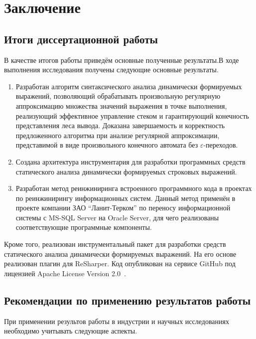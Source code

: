 \chapter*{Заключение}                       %

\section*{Итоги диссертационной работы}

В качестве итогов работы приведём основные полученные результаты.В ходе выполнения исследования получены следующие основные результаты.

\begin{enumerate}
    \item Разработан алгоритм синтаксического анализа динамически формируемых выражений, позволяющий обрабатывать произвольную регулярную аппроксимацию множества значений выражения в точке выполнения, реализующий 
    эффективное управление стеком и гарантирующий конечность представления леса вывода. Доказана завершаемость и корректность предложенного алгоритма при анализе регулярной аппроксимации, представимой в виде произвольного конечного автомата без $\varepsilon$-переходов.
    \item Создана архитектура инструментария для разработки программных средств статического анализа динамически формируемых строковых выражений.
    \item Разработан метод реинжиниринга встроенного программного кода в проектах по реинжинирингу информационных систем. Данный метод применён в проекте компании ЗАО ``Ланит-Терком'' по переносу информационной системы с MS-SQL Server на Oracle Server, для чего реализованы соответствующие программные компоненты.
\end{enumerate}

Кроме того, реализован инструментальный пакет для разработки средств статического анализа динамически формируемых выражений. На его основе реализован плагин для ReSharper. Код опубликован на сервисе GitHub под лицензией Apache License Version 2.0~\cite{YCUrl}.

\section*{Рекомендации по применению результатов работы}

При применении результов работы в индустрии и научных исследованиях необходимо учитывать следующие аспекты.

